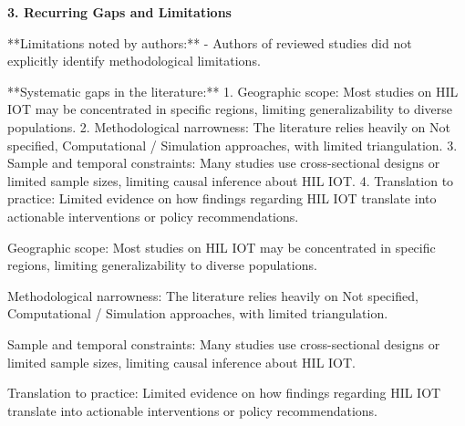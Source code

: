 \documentclass[11pt,a4paper]{article}
\begin{document}
\vspace{1em}


\textbf{\large 3. Recurring Gaps and Limitations}\par\vspace{0.5em}

**Limitations noted by authors:**
- Authors of reviewed studies did not explicitly identify methodological limitations.

**Systematic gaps in the literature:**
1. Geographic scope: Most studies on HIL IOT may be concentrated in specific regions, limiting generalizability to diverse populations.
2. Methodological narrowness: The literature relies heavily on Not specified, Computational / Simulation approaches, with limited triangulation.
3. Sample and temporal constraints: Many studies use cross-sectional designs or limited sample sizes, limiting causal inference about HIL IOT.
4. Translation to practice: Limited evidence on how findings regarding HIL IOT translate into actionable interventions or policy recommendations.

\vspace{0.5em}


\begin{gapbox}[Gap 1]
Geographic scope: Most studies on HIL IOT may be concentrated in specific regions, limiting generalizability to diverse populations.
\end{gapbox}

\vspace{0.3em}


\begin{gapbox}[Gap 2]
Methodological narrowness: The literature relies heavily on Not specified, Computational / Simulation approaches, with limited triangulation.
\end{gapbox}

\vspace{0.3em}


\begin{gapbox}[Gap 3]
Sample and temporal constraints: Many studies use cross-sectional designs or limited sample sizes, limiting causal inference about HIL IOT.
\end{gapbox}

\vspace{0.3em}


\begin{gapbox}[Gap 4]
Translation to practice: Limited evidence on how findings regarding HIL IOT translate into actionable interventions or policy recommendations.
\end{gapbox}
\end{document}
